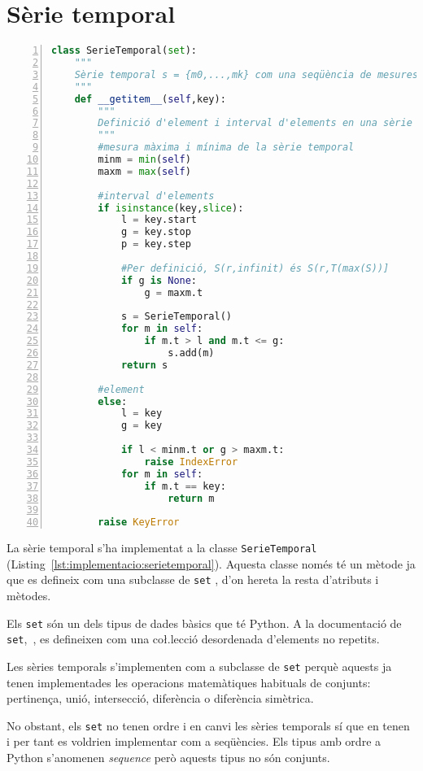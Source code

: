 \section{Sèrie temporal}

\begin{lstlisting}[float,language=Python,caption=Implementació de la classe SerieTemporal,label=lst:implementacio:serietemporal,numbers=left]
class SerieTemporal(set):
    """
    Sèrie temporal s = {m0,...,mk} com una seqüència de mesures ordenades en el temps
    """
    def __getitem__(self,key):
        """
        Definició d'element i interval d'elements en una sèrie temporal.
        """
        #mesura màxima i mínima de la sèrie temporal
        minm = min(self)
        maxm = max(self)

        #interval d'elements
        if isinstance(key,slice):    
            l = key.start
            g = key.stop
            p = key.step
 
            #Per definició, S(r,infinit) és S(r,T(max(S))]
            if g is None:
                g = maxm.t

            s = SerieTemporal()
            for m in self:
                if m.t > l and m.t <= g:
                    s.add(m)
            return s

        #element
        else:
            l = key
            g = key

            if l < minm.t or g > maxm.t:
                raise IndexError
            for m in self:
                if m.t == key:
                    return m
          
        raise KeyError
\end{lstlisting}                

La sèrie temporal s'ha implementat a la classe \verb+SerieTemporal+ (Listing~\ref{lst:implementacio:serietemporal}). Aquesta classe només té un mètode ja que es defineix com una subclasse de \verb+set+ , d'on hereta la resta d'atributs i mètodes.

Els \verb+set+ són un dels tipus de dades bàsics que té Python.  
A la documentació de \verb+set+,~\cite{pythondoc}, es defineixen com una co\l.lecció desordenada d'elements no repetits. 

Les sèries temporals s'implementen com a subclasse de \verb+set+ perquè aquests ja tenen implementades les operacions matemàtiques habituals de conjunts: pertinença, unió, intersecció, diferència o diferència simètrica.

No obstant, els \verb+set+ no tenen ordre i en canvi les sèries temporals sí que en tenen  i per tant es voldrien implementar com a seqüències. Els tipus amb ordre a Python s'anomenen \emph{sequence} però aquests tipus no són conjunts. 

